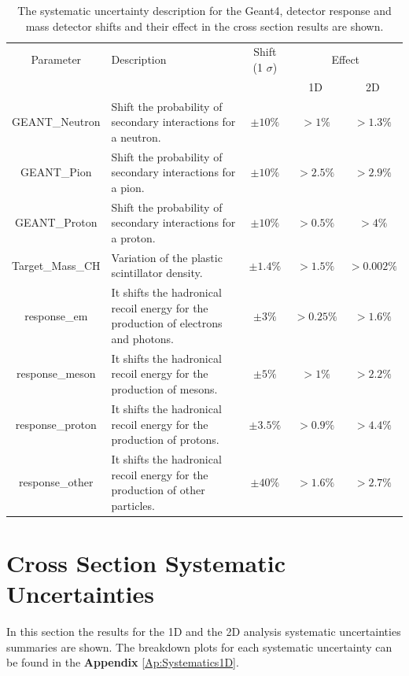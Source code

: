 \begin{table}[!htb]
    \centering
    \begin{tabular}{c|p{2in}|c|c|c}
        \hline 
        Parameter & Description  & Shift (1 $\sigma$) & \multicolumn{2}{c}{Effect} \\
         & & & 1D & 2D \\
        \hline  
        GEANT\_Neutron & Shift the probability of secondary interactions for a neutron.  & $\pm10\%$ & $>1\%$ & $>1.3\%$\\ \hline
        GEANT\_Pion & Shift the probability of secondary interactions for a pion. & $\pm10\%$ & $>2.5\%$ & $>2.9\%$ \\ \hline
        GEANT\_Proton & Shift the probability of secondary interactions for a proton. & $\pm10\%$ & $>0.5\%$ & $>4\%$ \\ \hline
        Target\_Mass\_CH & Variation of the plastic scintillator density. & $\pm1.4\%$ & $>1.5\%$ & $>0.002\%$\\ \hline
        response\_em & It shifts the hadronical recoil energy for the production of electrons and photons. & $\pm3\%$ & $>0.25\%$ & $>1.6\%$ \\ \hline
        response\_meson & It shifts the hadronical recoil energy for the production of mesons. & $\pm5\%$ & $>1\%$ & $>2.2\%$\\ \hline
        response\_proton & It shifts the hadronical recoil energy for the production of protons. & $\pm3.5\%$ & $>0.9\%$ & $>4.4\%$\\ \hline
        response\_other & It shifts the hadronical recoil energy for the production of other particles.& $\pm40\%$ & $>1.6\%$ & $>2.7\%$\\ \hline
    \end{tabular}
    \caption{The systematic uncertainty description for the Geant4, detector response and mass detector shifts and their effect in the cross section results are shown. }
    \label{tab:ErrorAnalysis:SystematicUnc:Other}
\end{table}


\pagebreak

\section{Cross Section Systematic Uncertainties}
\label{Cap:ErrorAnalysis:CrossSectionUncertainties}

In this section the results for the 1D and the 2D analysis systematic uncertainties summaries are shown. The breakdown plots for each systematic uncertainty can be found in the \textbf{Appendix} \ref{Ap:Systematics1D}.

